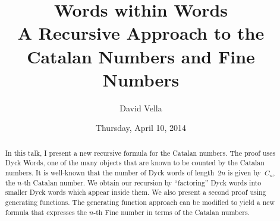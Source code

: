 \documentclass{UAmathtalk}
\author{David Vella}
\title{Words within Words\\ A Recursive Approach to the\\ Catalan Numbers and Fine Numbers}
\date{Thursday, April 10, 2014}
\begin{document}
\maketitle

\begin{abstract}
In this talk, I present a new recursive formula for the Catalan numbers.
The proof uses Dyck Words, one of the many objects that are known to be counted by the Catalan numbers.
It is well-known that the number of Dyck words of length~$2n$ is given by~$C_n$, the $n$-th Catalan number.
We obtain our recursion by ``factoring'' Dyck words into smaller Dyck words which appear inside them.
We also present a second proof using generating functions.
The generating function approach can be modified to yield a new formula that expresses the $n$-th Fine number in terms of the Catalan numbers.
\end{abstract}
\end{document}
